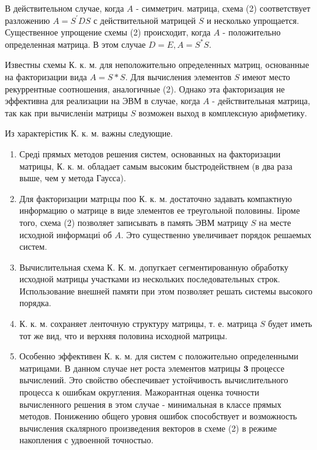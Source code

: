 \documentclass[10pt]{article}
\begin{document}
В действительном случае, когда $A$ - симметрич. матрица, схема (2) соответствует разложению $A=S^{\prime} D S$ с действительной матрицей $S$ и несколько упрощается. Существенное упрощение схемы (2) происходит, когда $A$ - положительно определенная матрица. В этом случае $D=E, A=S^{*} S$.



Известны схемы К. к. м. для неположительно определенных матриц, основанные на факторизации вида $A=S * S$. Для вычисления элементов $S$ имеют место рекуррентные соотношения, аналогичные (2). Однако эта факторизация не эффективна для реализации на ЭВМ в случае, когда $A$ - действительная матрица, так как при вычисленіи матрицы $S$ возможен выход в комплексную арифметику.



Из характерістик К. к. м. важны следующие.



\begin{enumerate}

  \item Среді прямых методов решения систем, основанных на факторизации матрицы, К. к. м. обладает самым высоким быстродействнем (в два раза выше, чем у метода Гаусса).



  \item Для факторизации матрıцы поо К. к. м. достаточно задавать компактную информацию о матрице в виде элементов ее треугольной половины. Ііроме того, схема (2) позволяет записывать в память ЭВМ матрицу $S$ на месте исходной информациі об $A$. Это существенно увеличивает порядок решаемых систем.



  \item Вычислительная схема К. К. м. допугкает сегментированную обработку исходной матрицы участками из нескольких последовательных строк. Использование внешней памяти при этом позволяет решать системы высокого порядка.



  \item К. к. м. сохраняет ленточную структуру матрицы, т. е. матрица $S$ будет иметь тот же вид, что и верхняя половина исходной матрицы.



  \item Особенно эффективен К. к. м. для систем с положительно определенными матрицами. В данном случае нет роста элементов матрицы $\mathbf{3}$ процессе вычислений. Это свойство обеспечивает устойчивость вычислительного процесса к ошибкам округления. Мажорантная оценка точности вычисленного решения в этом случае - минимальная в классе прямых методов. Понижению общего уровня ошибок способствует и возможность вычисления скалярного произведения векторов в схеме (2) в режиме накопления с удвоенной точностыо.



\end{enumerate}
\end{document}
